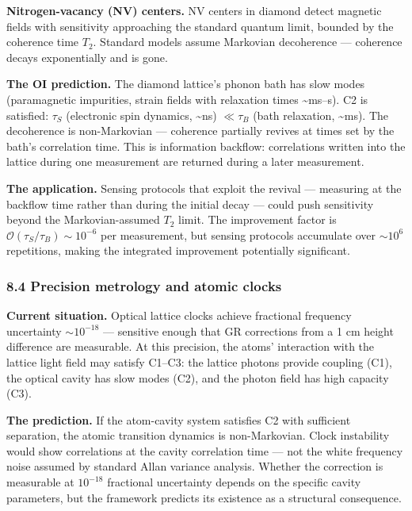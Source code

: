 \documentclass[
]{article}
\begin{document}
\textbf{Nitrogen-vacancy (NV) centers.} NV centers in diamond detect
magnetic fields with sensitivity approaching the standard quantum limit,
bounded by the coherence time \(T_2\). Standard models assume Markovian
decoherence --- coherence decays exponentially and is gone.

\textbf{The OI prediction.} The diamond lattice's phonon bath has slow
modes (paramagnetic impurities, strain fields with relaxation times
\textasciitilde ms--s). C2 is satisfied: \(\tau_S\) (electronic spin
dynamics, \textasciitilde ns) \(\ll \tau_B\) (bath relaxation,
\textasciitilde ms). The decoherence is non-Markovian --- coherence
partially revives at times set by the bath's correlation time. This is
information backflow: correlations written into the lattice during one
measurement are returned during a later measurement.

\textbf{The application.} Sensing protocols that exploit the revival ---
measuring at the backflow time rather than during the initial decay ---
could push sensitivity beyond the Markovian-assumed \(T_2\) limit. The
improvement factor is \(\mathcal{O}(\tau_S / \tau_B) \sim 10^{-6}\) per
measurement, but sensing protocols accumulate over \(\sim 10^6\)
repetitions, making the integrated improvement potentially significant.

\hypertarget{precision-metrology-and-atomic-clocks}{%
\subsubsection{8.4 Precision metrology and atomic
clocks}\label{precision-metrology-and-atomic-clocks}}

\textbf{Current situation.} Optical lattice clocks achieve fractional
frequency uncertainty \(\sim 10^{-18}\) --- sensitive enough that GR
corrections from a 1 cm height difference are measurable. At this
precision, the atoms' interaction with the lattice light field may
satisfy C1--C3: the lattice photons provide coupling (C1), the optical
cavity has slow modes (C2), and the photon field has high capacity (C3).

\textbf{The prediction.} If the atom-cavity system satisfies C2 with
sufficient separation, the atomic transition dynamics is non-Markovian.
Clock instability would show correlations at the cavity correlation time
--- not the white frequency noise assumed by standard Allan variance
analysis. Whether the correction is measurable at \(10^{-18}\)
fractional uncertainty depends on the specific cavity parameters, but
the framework predicts its existence as a structural consequence.
\end{document}
